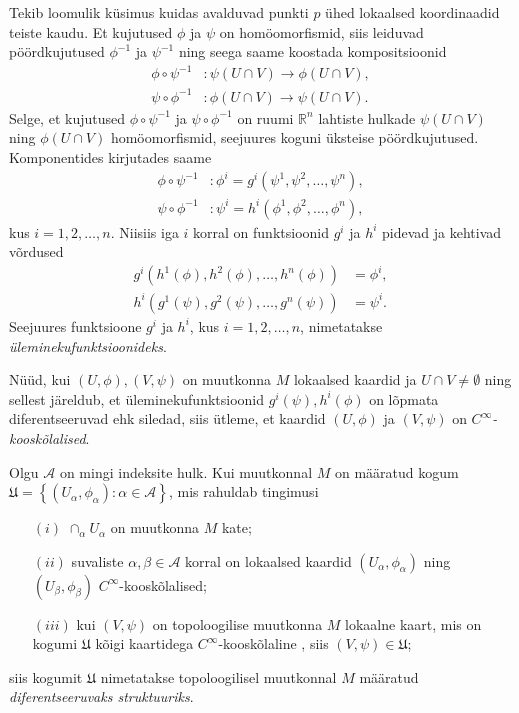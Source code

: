 \documentclass[12pt]{article}
\theoremstyle{plain}
\theoremstyle{definition}
\numberwithin{equation}{section}
\def\R{{\mathbb R}}
\begin{document}
Tekib loomulik küsimus kuidas avalduvad punkti $p$ ühed lokaalsed 
koordinaadid teiste kaudu. Et kujutused $\phi$ ja $\psi$ on 
homöomorfismid, siis leiduvad pöördkujutused $\phi^{-1}$ ja 
$\psi^{-1}$ ning seega saame koostada kompositsioonid
\begin{align*}
\phi \circ \psi^{-1} &: \psi\left(U \cap V\right) \rightarrow 
\phi\left(U \cap V\right), \\
\psi \circ \phi^{-1} &: \phi\left(U \cap V\right) \rightarrow 
\psi\left(U \cap V\right).
\end{align*}
Selge, et kujutused $\phi \circ \psi^{-1}$ ja $\psi \circ 
\phi^{-1}$ on ruumi $\R^n$ lahtiste hulkade 
$\psi\left(U \cap V\right)$ ning $\phi \left(U \cap V\right)$ 
homöomorfismid, seejuures koguni üksteise pöördkujutused. 
Komponentides kirjutades saame
\begin{align*}
\phi \circ \psi^{-1} &: \phi^i = g^i \left(\psi^1, \psi^2, 
\ldots, \psi^n\right), \\
\psi \circ \phi^{-1} &: \psi^i = h^i \left(\phi^1, \phi^2, 
\ldots, \phi^n\right),
\end{align*}
kus $i = 1, 2, \ldots, n$. Niisiis iga $i$ korral on funktsioonid 
$g^i$ ja $h^i$ pidevad ja kehtivad võrdused
\begin{align*}
g^i \left(h^1\left(\phi\right), h^2\left(\phi\right), \ldots, 
h^n\left(\phi\right)\right) &= \phi^i, \\
h^i \left(g^1\left(\psi\right), g^2\left(\psi\right), \ldots, 
g^n\left(\psi\right)\right) &= \psi^i.
\end{align*}
Seejuures funktsioone $g^i$ ja $h^i$, kus $i = 1, 2, \ldots, n$, 
nimetatakse \emph{üleminekufunktsioo\-nideks}. 

Nüüd, kui $\left(U, \phi\right), \left(V, \psi\right)$ on muutkonna 
$M$ lokaalsed kaardid ja $U \cap V \neq \emptyset$ ning sellest 
järeldub, et üleminekufunktsioonid 
$g^i\left(\psi\right), h^i\left(\phi\right)$ on lõpmata 
diferentseeruvad ehk siledad, siis ütleme, et kaardid 
$\left(U, \phi\right)$ ja $\left(V, \psi\right)$ on 
$C^{\infty}$\emph{-kooskõlalised}.

Olgu $\mathcal{A}$ on mingi indeksite hulk. Kui muutkonnal $M$ on 
määratud kogum $\mathfrak{U} = \left\lbrace \left(U_\alpha, 
\phi_\alpha\right) : \alpha \in \mathcal{A} \right\rbrace$, 
mis rahuldab tingimusi
\begin{itemize}
\item [$\left(i\right)$] $\cap_\alpha U_\alpha$ on muutkonna $M$ kate;
\item [$\left(ii\right)$] suvaliste $\alpha, \beta \in \mathcal{A}$ 
korral on lokaalsed kaardid $\left(U_\alpha, \phi_\alpha\right)$ ning 
$\left(U_\beta, \phi_\beta\right)$ $C^\infty$-kooskõlalised;
\item [$\left(iii\right)$] kui $\left(V, \psi\right)$ on topoloogilise 
muutkonna $M$ lokaalne kaart, mis on kogumi $\mathfrak{U}$ kõigi 
kaartidega $C^\infty$-kooskõlaline , siis 
$\left(V, \psi\right) \in \mathfrak{U}$;
\end{itemize}
siis kogumit $\mathfrak{U}$ nimetatakse topoloogilisel muutkonnal 
$M$ määratud \emph{diferentseeruvaks struktuuriks}.
\end{document}
